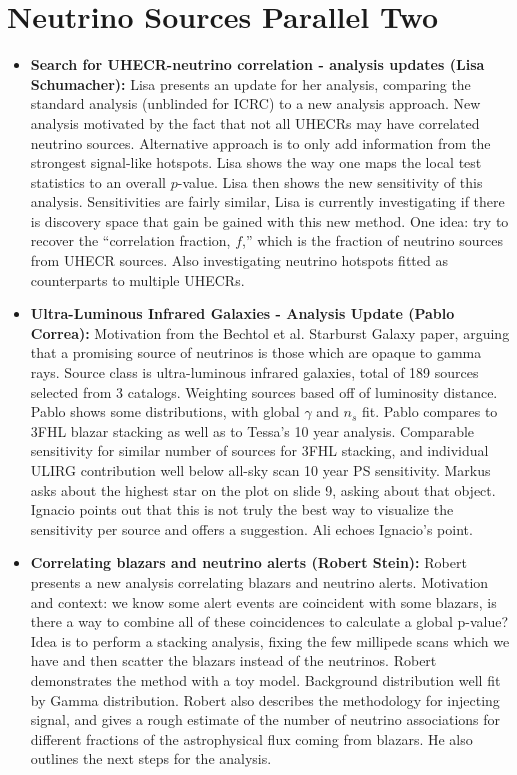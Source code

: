 \begin{itemize}
\end{itemize}

\section*{Neutrino Sources Parallel Two}
\begin{itemize}
    \item \textbf{Search for UHECR-neutrino correlation - analysis updates (Lisa Schumacher):} Lisa presents an update for her analysis, comparing the standard analysis (unblinded for ICRC) to a new analysis approach. New analysis motivated by the fact that not all UHECRs may have correlated neutrino sources. Alternative approach is to only add information from the strongest signal-like hotspots. Lisa shows the way one maps the local test statistics to an overall $p$-value. Lisa then shows the new sensitivity of this analysis. Sensitivities are fairly similar, Lisa is currently investigating if there is discovery space that gain be gained with this new method. One idea: try to recover the ``correlation fraction, $f$,'' which is the fraction of neutrino sources from UHECR sources. Also investigating neutrino hotspots fitted as counterparts to multiple UHECRs.
    \item \textbf{Ultra-Luminous Infrared Galaxies - Analysis Update (Pablo Correa):} Motivation from the Bechtol et al. Starburst Galaxy paper, arguing that a promising source of neutrinos is those which are opaque to gamma rays. Source class is ultra-luminous infrared galaxies, total of 189 sources selected from 3 catalogs. Weighting sources based off of luminosity distance. Pablo shows some distributions, with global $\gamma$ and $n_s$ fit. Pablo compares to 3FHL blazar stacking as well as to Tessa's 10 year analysis. Comparable sensitivity for similar number of sources for 3FHL stacking, and individual ULIRG contribution well below all-sky scan 10 year PS sensitivity. Markus asks about the highest star on the plot on slide 9, asking about that object. Ignacio points out that this is not truly the best way to visualize the sensitivity per source and offers a suggestion. Ali echoes Ignacio's point. 
    \item \textbf{Correlating blazars and neutrino alerts (Robert Stein):} Robert presents a new analysis correlating blazars and neutrino alerts. Motivation and context: we know some alert events are coincident with some blazars, is there a way to combine all of these coincidences to calculate a global p-value? Idea is to perform a stacking analysis, fixing the few millipede scans which we have and then scatter the blazars instead of the neutrinos. Robert demonstrates the method with a toy model. Background distribution well fit by Gamma distribution. Robert also describes the methodology for injecting signal, and gives a rough estimate of the number of neutrino associations for different fractions of the astrophysical flux coming from blazars. He also outlines the next steps for the analysis. 

\end{itemize}
